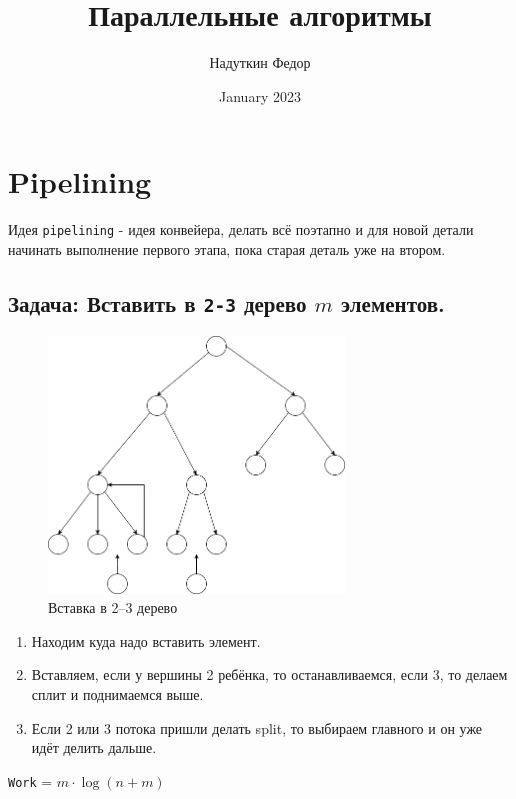 \documentclass[11pt]{article}
\title{Параллельные алгоритмы}
\author{Надуткин Федор }
\date{January 2023}
\begin{document}
    \maketitle
    \newpage

    \section*{Pipelining}

    Идея \texttt{pipelining} - идея конвейера, делать всё поэтапно и для новой детали начинать выполнение первого этапа,
    пока старая деталь уже на втором.

    \subsection*{Задача: Вставить в \texttt{2-3} дерево $m$ элементов.}

    \begin{figure}[h!]
        \centering
        \includegraphics[width=0.7\textwidth]{Pictures/Pipelining/2-3}
        \caption{Вставка в 2--3 дерево}
        \label{fig:2-3_tree}
    \end{figure}

    \begin{enumerate}
        \item Находим куда надо вставить элемент.
        \item Вставляем, если у вершины 2 ребёнка, то останавливаемся, если 3, то делаем сплит и поднимаемся выше.
        \item Если 2 или 3 потока пришли делать split, то выбираем главного и он уже идёт делить дальше.
    \end{enumerate}

    \texttt{Work} = $m \cdot \log{(n + m)}$
\end{document}

